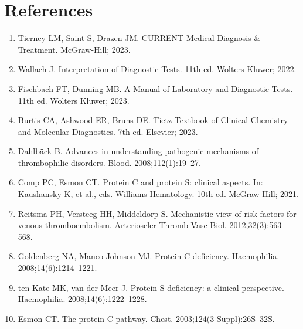 \section*{References}
\begin{enumerate}
  \item Tierney LM, Saint S, Drazen JM. CURRENT Medical Diagnosis \& Treatment. McGraw-Hill; 2023.
  \item Wallach J. Interpretation of Diagnostic Tests. 11th ed. Wolters Kluwer; 2022.
  \item Fischbach FT, Dunning MB. A Manual of Laboratory and Diagnostic Tests. 11th ed. Wolters Kluwer; 2023.
  \item Burtis CA, Ashwood ER, Bruns DE. Tietz Textbook of Clinical Chemistry and Molecular Diagnostics. 7th ed. Elsevier; 2023.
  \item Dahlb\"{a}ck B. Advances in understanding pathogenic mechanisms of thrombophilic disorders. Blood. 2008;112(1):19--27.
  \item Comp PC, Esmon CT. Protein C and protein S: clinical aspects. In: Kaushansky K, et al., eds. Williams Hematology. 10th ed. McGraw-Hill; 2021.
  \item Reitsma PH, Versteeg HH, Middeldorp S. Mechanistic view of risk factors for venous thromboembolism. Arterioscler Thromb Vasc Biol. 2012;32(3):563--568.
  \item Goldenberg NA, Manco-Johnson MJ. Protein C deficiency. Haemophilia. 2008;14(6):1214--1221.
  \item ten Kate MK, van der Meer J. Protein S deficiency: a clinical perspective. Haemophilia. 2008;14(6):1222--1228.
  \item Esmon CT. The protein C pathway. Chest. 2003;124(3 Suppl):26S--32S.
\end{enumerate}

\clearpage
